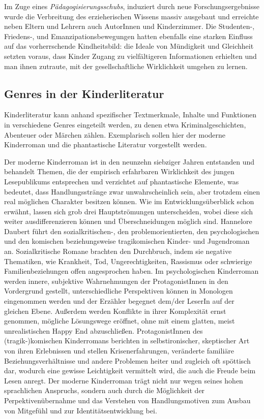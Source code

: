     Im Zuge eines \emph{Pädagogisierungsschubs}, induziert durch neue
    Forschungsergebnisse wurde die Verbreitung des erzieherischen Wissens massiv
    ausgebaut und erreichte neben Eltern und Lehrern auch AutorInnen und
    Kinderzimmer. Die Studenten-, Friedens-, und Emanzipationsbewegungen hatten
    ebenfalls eine starken Einfluss auf das vorherrschende Kindheitsbild: die
    Ideale von Mündigkeit und Gleichheit setzten voraus, dass Kinder Zugang zu
    vielfältigeren Informationen erhielten und man ihnen zutraute, mit der
    gesellschaftliche Wirklichkeit umgehen zu lernen.
    \parencite[88]{Daubert2011}

  \subsection{Genres in der Kinderliteratur}

    Kinderliteratur kann anhand spezifischer Textmerkmale, Inhalte und
    Funktionen in verschiedene Genres  eingeteilt werden, zu denen etwa
    Kriminalgeschichten, Abenteuer oder Märchen zählen. Exemplarisch sollen hier
    der moderne Kinderroman und die phantastische Literatur vorgestellt werden.

           Der moderne Kinderroman ist in den
neunzehn siebziger Jahren entstanden und behandelt Themen, die der empirisch
erfahrbaren Wirklichkeit des jungen Lesepublikums entsprechen und verzichtet auf
phantastische Elemente, was bedeutet, dass Handlungsstränge zwar
unwahrscheinlich sein, aber trotzdem einen real möglichen Charakter besitzen
können. Wie im Entwicklungsüberblick schon erwähnt, lassen sich grob drei
Hauptströmungen unterscheiden, wobei diese sich weiter ausdifferenzieren können
und Überschneidungen möglich sind. Hannelore Daubert führt den
sozialkritischen-, den problemorientierten, den psychologischen und den
komischen beziehungsweise tragikomischen Kinder- und Jugendroman an.
\parencite[89]{Daubert2011} Sozialkritische Romane brachten den Durchbruch,
indem sie negative Thematiken, wie Krankheit, Tod, Ungerechtigkeiten, Rassismus
oder schwierige  Familienbeziehungen offen angesprochen haben. Im
psychologischen Kinderroman werden innere, subjektive Wahrnehmungen der
ProtagonistInnen in den Vordergrund gestellt, unterschiedliche Perspektiven
können in Monologen eingenommen werden und der Erzähler begegnet dem/der LeserIn
auf der gleichen Ebene. Außerdem werden Konflikte in ihrer Komplexität ernst
genommen, mögliche Lösungswege eröffnet, ohne mit einem glatten, meist
unrealistischen Happy End abzuschließen. ProtagonistInnen des (tragik-)komischen
Kinderromans berichten in selbstironischer, skeptischer Art von ihren
Erlebnissen und stellen Krisenerfahrungen, veränderte familiäre
Beziehungsverhältnisse und andere Problemen heiter und zugleich oft spöttisch
dar, wodurch eine gewisse Leichtigkeit vermittelt wird, die auch die Freude beim
Lesen anregt. Der moderne Kinderroman trägt nicht nur wegen seines hohen
sprachlichen Anspruchs, sondern auch durch die Möglichkeit der
Perpektivenübernahme und das Verstehen von Handlungsmotiven zum Ausbau von
Mitgefühl und zur Identitätsentwicklung bei.

